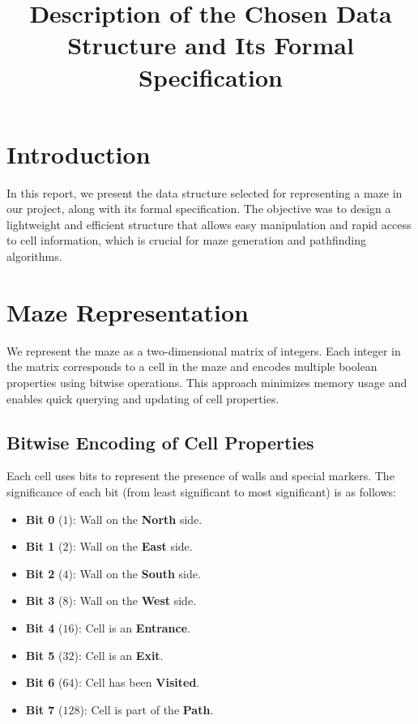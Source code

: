 \documentclass{article}
\begin{document}
\title{Description of the Chosen Data Structure and Its Formal Specification}
\author{}
\date{}
\maketitle

\section*{Introduction}

In this report, we present the data structure selected for representing a maze in our project, along with its formal specification. The objective was to design a lightweight and efficient structure that allows easy manipulation and rapid access to cell information, which is crucial for maze generation and pathfinding algorithms.

\section*{Maze Representation}

We represent the maze as a two-dimensional matrix of integers. Each integer in the matrix corresponds to a cell in the maze and encodes multiple boolean properties using bitwise operations. This approach minimizes memory usage and enables quick querying and updating of cell properties.

\subsection*{Bitwise Encoding of Cell Properties}

Each cell uses bits to represent the presence of walls and special markers. The significance of each bit (from least significant to most significant) is as follows:

\begin{itemize}
    \item \textbf{Bit 0} (\(1\)): Wall on the \textbf{North} side.
    \item \textbf{Bit 1} (\(2\)): Wall on the \textbf{East} side.
    \item \textbf{Bit 2} (\(4\)): Wall on the \textbf{South} side.
    \item \textbf{Bit 3} (\(8\)): Wall on the \textbf{West} side.
    \item \textbf{Bit 4} (\(16\)): Cell is an \textbf{Entrance}.
    \item \textbf{Bit 5} (\(32\)): Cell is an \textbf{Exit}.
    \item \textbf{Bit 6} (\(64\)): Cell has been \textbf{Visited}.
    \item \textbf{Bit 7} (\(128\)): Cell is part of the \textbf{Path}.
\end{itemize}
\end{document}
